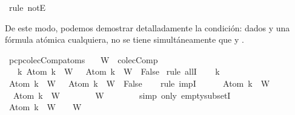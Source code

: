 \begin{isabellebody}
\ {\isacharparenleft}rule\ notE{\isacharparenright}\isanewline
{}\isamarkupfalse%
%
\endisatagproof
{\isafoldproof}%
%
\isadelimproof
%
\endisadelimproof
%
\begin{isamarkuptext}%
De este modo, podemos demostrar detalladamente la condición: dados  y  una fórmula
  atómica cualquiera, no se tiene simultáneamente que  y .%
\end{isamarkuptext}\isamarkuptrue%
\isamarkupfalse%
\ pcp{\isacharunderscore}colecComp{\isacharunderscore}atoms{\isacharcolon}\isanewline
\ \ \ {\isachardoublequoteopen}W\ {\isasymin}\ colecComp{\isachardoublequoteclose}\isanewline
\ \ \ {\isachardoublequoteopen}{\isasymforall}k{\isachardot}\ Atom\ k\ {\isasymin}\ W\ {\isasymlongrightarrow}\ \isactrlbold {\isasymnot}\ {\isacharparenleft}Atom\ k{\isacharparenright}\ {\isasymin}\ W\ {\isasymlongrightarrow}\ False{\isachardoublequoteclose}\isanewline
%
\isadelimproof
%
\endisadelimproof
%
\isatagproof
{}\isamarkupfalse%
\ {\isacharparenleft}rule\ allI{\isacharparenright}\isanewline
\ \ \isamarkupfalse%
\ k\isanewline
\ \ \isamarkupfalse%
\ {\isachardoublequoteopen}Atom\ k\ {\isasymin}\ W\ {\isasymlongrightarrow}\ \isactrlbold {\isasymnot}\ {\isacharparenleft}Atom\ k{\isacharparenright}\ {\isasymin}\ W\ {\isasymlongrightarrow}\ False{\isachardoublequoteclose}\isanewline
\ \ \isamarkupfalse%
\ {\isacharparenleft}rule\ impI{\isacharparenright}{\isacharplus}\isanewline
\ \ \ \ \isamarkupfalse%
\ {}{\isacharcolon}{\isachardoublequoteopen}Atom\ k\ {\isasymin}\ W{\isachardoublequoteclose}\isanewline
\ \ \ \ \isamarkupfalse%
\ {}{\isacharcolon}{\isachardoublequoteopen}\isactrlbold {\isasymnot}\ {\isacharparenleft}Atom\ k{\isacharparenright}\ {\isasymin}\ W{\isachardoublequoteclose}\isanewline
\ \ \ \ \isamarkupfalse%
\ {\isachardoublequoteopen}{\isacharbraceleft}{\isacharbraceright}\ {\isasymsubseteq}\ W{\isachardoublequoteclose}\isanewline
\ \ \ \ \ \ \isamarkupfalse%
\ {\isacharparenleft}simp\ only{\isacharcolon}\ empty{\isacharunderscore}subsetI{\isacharparenright}\ \isanewline
\ \ \ \ \isamarkupfalse%
\ {\isachardoublequoteopen}Atom\ k\ {\isasymin}\ W\ {\isasymand}\ {\isacharbraceleft}{\isacharbraceright}\ {\isasymsubseteq}\ W{\isachardoublequoteclose}\isanewline
\ \ \ \ \ \ \isamarkupfalse%

\end{isabellebody}
